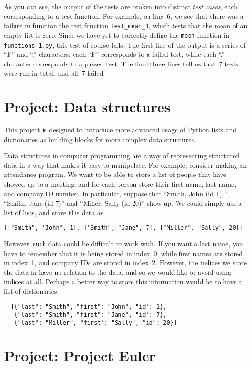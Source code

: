 \documentclass{article}
\begin{document}
\noindent As you can see, the output of the tests are broken into
distinct \textit{test cases}, each corresponding to a test
function. For example, on line~6, we see that there was a failure in
function the test function \texttt{test\_mean\_1}, which tests that
the mean of an empty list is zero. Since we have yet to correctly
define the \texttt{mean} function in \texttt{functions-1.py}, this
test of course fails. The first line of the output is a series of
``F'' and ``.''  characters; each ``F'' corresponds to a failed test,
while each ``.''  character corresponds to a passed test. The final
three lines tell us that~7 tests were run in total, and all~7 failed.

\section{Project: Data structures}

This project is designed to introduce more advanced usage of Python
lists and dictionaries as building blocks for more complex data
structures.

Data structures in computer programming are a way of representing
structured data in a way that makes it easy to manipulate. For
example, consider making an attendance program. We want to be able to
store a list of people that have showed up to a meeting, and for each
person store their first name, last name, and company ID number. In
particular, suppose that ``Smith, John (id 1),'' ``Smith, Jane (id
7)'' and ``Miller, Sally (id 20)'' show up. We
could simply use a list of lists, and store this data as
\begin{lstlisting}
[["Smith", "John", 1], ["Smith", "Jane", 7], ["Miller", "Sally", 20]]
\end{lstlisting}
However, such data could be difficult to work with. If you want a last
name, you have to remember that it is being stored in index~0, while
first names are stored in index~1, and company IDs are stored in
index~2. However, the indices we store the data in have no relation to
the data, and so we would like to avoid using indices at all. Perhaps
a better way to store this information would be to have a list of
dictionaries:
\begin{lstlisting}
  [{"last": "Smith", "first": "John", "id": 1},
   {"last": "Smith", "first": "Jane", "id": 7},
   {"last": "Miller", "first": "Sally", "id": 20}]
\end{lstlisting}

\section{Project: Project Euler}
\end{document}
